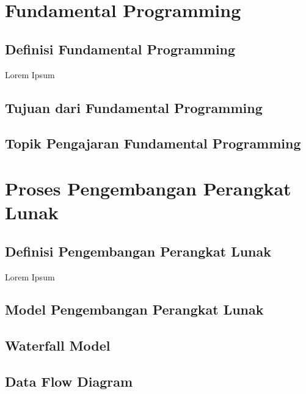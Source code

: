 \section{Fundamental Programming}
	\subsection{Definisi Fundamental Programming}
	Lorem Ipsum
	\subsection{Tujuan dari Fundamental Programming}
	\subsection{Topik Pengajaran Fundamental Programming}
	
\section{Proses Pengembangan Perangkat Lunak}
	\subsection{Definisi Pengembangan Perangkat Lunak}
	Lorem Ipsum
	\subsection{Model Pengembangan Perangkat Lunak}
	\subsection{Waterfall Model}
	\subsection{Data Flow Diagram}
